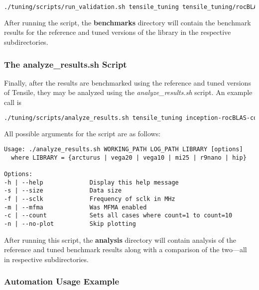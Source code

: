 \documentclass[]{article}
\begin{document}
\begin{lstlisting}[language=bash,breaklines=true]
./tuning/scripts/run_validation.sh tensile_tuning tensile_tuning/rocBLAS/
\end{lstlisting}

After running the script, the \textbf{benchmarks} directory will contain the benchmark results for the reference and tuned versions of the library in the respective subdirectories.

\subsubsection{The analyze\_results.sh Script}
\label{sec:analyse}

\noindent
Finally, after the results are benchmarked using the reference and tuned versions of Tensile, they may be analyzed using the \emph{analyze\_results.sh} script. An example call is

\begin{lstlisting}[language=bash,breaklines=true]
./tuning/scripts/analyze_results.sh tensile_tuning inception-rocBLAS-configs_unique.log vega20 -s 2 -f 1301
\end{lstlisting}

\noindent
All possible arguments for the script are as follows:

\begin{lstlisting}
Usage: ./analyze_results.sh WORKING_PATH LOG_PATH LIBRARY [options]
  where LIBRARY = {arcturus | vega20 | vega10 | mi25 | r9nano | hip}

Options:
-h | --help             Display this help message
-s | --size             Data size
-f | --sclk             Frequency of sclk in MHz
-m | --mfma             Was MFMA enabled
-c | --count            Sets all cases where count=1 to count=10
-n | --no-plot          Skip plotting
\end{lstlisting}

After running this script, the \textbf{analysis} directory will contain analysis of the reference and tuned benchmark results along with a comparison of the two---all in respective subdirectories.

\subsubsection{Automation Usage Example}
\end{document}
